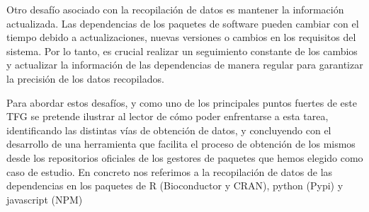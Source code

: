 Otro desafío asociado con la recopilación de datos es mantener la información actualizada. Las dependencias de los paquetes de software pueden cambiar con el tiempo debido a actualizaciones, nuevas versiones o cambios en los requisitos del sistema. Por lo tanto, es crucial realizar un seguimiento constante de los cambios y actualizar la información de las dependencias de manera regular para garantizar la precisión de los datos recopilados.


Para abordar estos desafíos, y como uno de los principales puntos fuertes de este TFG se pretende ilustrar al lector de cómo poder enfrentarse a esta tarea, identificando las distintas vías de obtención de datos, y concluyendo con el desarrollo de una herramienta que facilita el proceso de obtención de los mismos desde los repositorios oficiales de los gestores de paquetes que hemos elegido como caso de estudio.  En concreto nos referimos a la recopilación de datos de las dependencias en los paquetes de R (Bioconductor y CRAN), python (Pypi) y javascript (NPM)
